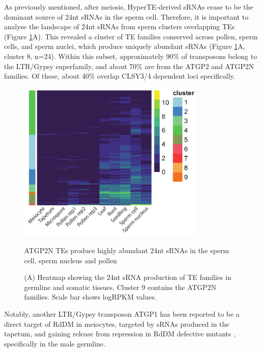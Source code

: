 As previously mentioned, after meiosis, HyperTE-derived sRNAs cease to be the dominant source of 24nt sRNAs in the sperm cell. Therefore, it is important to analyse the landscape of 24nt sRNAs from sperm clusters overlapping TEs (Figure \ref{fig:TE_families}A). This revealed a cluster of TE families conserved across pollen, sperm cells, and sperm nuclei, which produce uniquely abundant sRNAs (Figure \ref{fig:TE_families}A, cluster 8, n=24). Within this subset, approximately 90\% of transposons belong to the LTR/Gypsy superfamily, and about 70\% are from the ATGP2 and ATGP2N families. Of these, about 40\% overlap CLSY3/4 dependent loci specifically.

\begin{figure}[htbp!] 
\centering    
    \includegraphics[width=0.8\textwidth]{Chapter2/Figs/Figure13_TE_families_heatmap.pdf}
\caption{ATGP2N TEs produce highly abundant 24nt sRNAs in the sperm cell, sperm nucleus and pollen}
\label{fig:TE_families}
\captionsetup{font=small}
    \caption*{(A) Heatmap showing the 24nt sRNA production of TE families in germline and somatic tissues. Cluster 9 contains the ATGP2N families. Scale bar shows logRPKM values.}
\end{figure}

Notably, another LTR/Gypsy transposon ATGP1 has been reported to be a direct target of RdDM in meiocytes, targeted by sRNAs produced in the tapetum, and gaining release from repression in RdDM defective mutants \cite{RN187}, specifically in the male germline.


